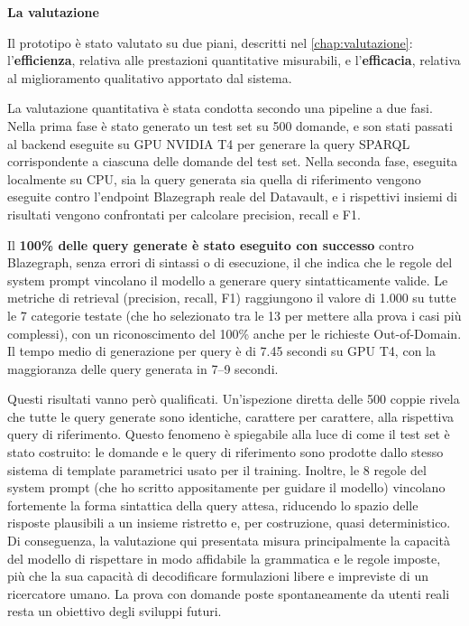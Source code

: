 \textbf{La valutazione}

Il prototipo è stato valutato su due piani, descritti nel \cref{chap:valutazione}: l'\textbf{efficienza}, relativa alle prestazioni quantitative misurabili, e l'\textbf{efficacia}, relativa al miglioramento qualitativo apportato dal sistema.

La valutazione quantitativa è stata condotta secondo una pipeline a due fasi. Nella prima fase è stato generato un test set su 500 domande, e son stati passati al backend eseguite su GPU NVIDIA T4 per generare la query SPARQL corrispondente a ciascuna delle domande del test set. Nella seconda fase, eseguita localmente su CPU, sia la query generata sia quella di riferimento vengono eseguite contro l'endpoint Blazegraph reale del Datavault, e i rispettivi insiemi di risultati vengono confrontati per calcolare precision, recall e F1.

Il \textbf{100\% delle query generate è stato eseguito con successo} contro Blazegraph, senza errori di sintassi o di esecuzione, il che indica che le regole del system prompt vincolano il modello a generare query sintatticamente valide. Le metriche di retrieval (precision, recall, F1) raggiungono il valore di 1.000 su tutte le 7 categorie testate (che ho selezionato tra le 13 per mettere alla prova i casi più complessi), con un riconoscimento del 100\% anche per le richieste Out-of-Domain. Il tempo medio di generazione per query è di 7.45 secondi su GPU T4, con la maggioranza delle query generata in 7--9 secondi.

Questi risultati vanno però qualificati. Un'ispezione diretta delle 500 coppie rivela che tutte le query generate sono identiche, carattere per carattere, alla rispettiva query di riferimento. Questo fenomeno è spiegabile alla luce di come il test set è stato costruito: le domande e le query di riferimento sono prodotte dallo stesso sistema di template parametrici usato per il training. Inoltre, le 8 regole del system prompt (che ho scritto appositamente per guidare il modello) vincolano fortemente la forma sintattica della query attesa, riducendo lo spazio delle risposte plausibili a un insieme ristretto e, per costruzione, quasi deterministico. Di conseguenza, la valutazione qui presentata misura principalmente la capacità del modello di rispettare in modo affidabile la grammatica e le regole imposte, più che la sua capacità di decodificare formulazioni libere e impreviste di un ricercatore umano. La prova con domande poste spontaneamente da utenti reali resta un obiettivo degli sviluppi futuri.

